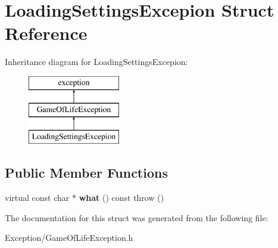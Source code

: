 \hypertarget{struct_loading_settings_excepion}{}\section{Loading\+Settings\+Excepion Struct Reference}
\label{struct_loading_settings_excepion}
Inheritance diagram for Loading\+Settings\+Excepion\+:\begin{figure}[H]
\begin{center}
\leavevmode
\includegraphics[height=3.000000cm]{struct_loading_settings_excepion}
\end{center}
\end{figure}
\subsection*{Public Member Functions}
\begin{DoxyCompactItemize}
\item 
\hypertarget{struct_loading_settings_excepion_a33f454b0c3084f407f988df5568fa5b2}{}virtual const char $\ast$ {\bfseries what} () const   throw ()\label{struct_loading_settings_excepion_a33f454b0c3084f407f988df5568fa5b2}

\end{DoxyCompactItemize}


The documentation for this struct was generated from the following file\+:\begin{DoxyCompactItemize}
\item 
Exception/Game\+Of\+Life\+Exception.\+h\end{DoxyCompactItemize}
